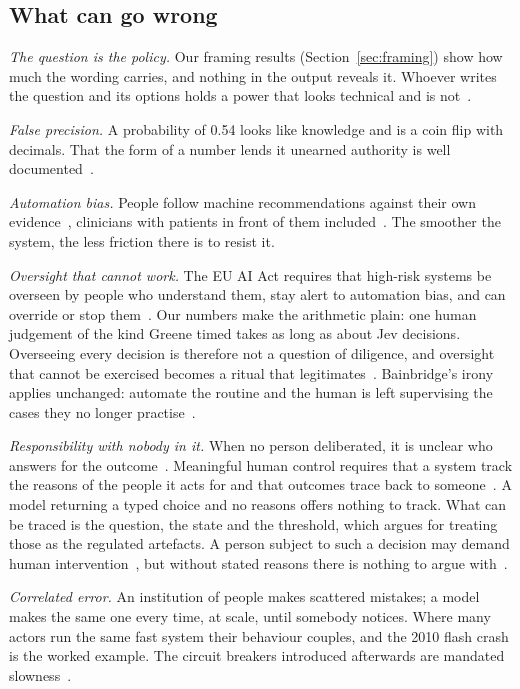 \documentclass[journal]{IEEEtran}
\begin{document}
\subsection{What can go wrong}

\emph{The question is the policy.} Our framing results (Section~\ref{sec:framing}) show how much
the wording carries, and nothing in the output reveals it. Whoever writes the question and its
options holds a power that looks technical and is not~\cite{rahwan2018}.

\emph{False precision.} A probability of 0.54 looks like knowledge and is a coin flip with
decimals. That the form of a number lends it unearned authority is well
documented~\cite{mittelstadt2016}.

\emph{Automation bias.} People follow machine recommendations against their own
evidence~\cite{skitka1999,parasuraman1997}, clinicians with patients in front of them
included~\cite{goddard2012}. The smoother the system, the less friction there is to resist it.

\emph{Oversight that cannot work.} The EU AI Act requires that high-risk systems be overseen by
people who understand them, stay alert to automation bias, and can override or stop
them~\cite{euaiact2024}. Our numbers make the arithmetic plain: one human judgement of the kind
Greene timed takes as long as about \DecisionsPerHumanOne{} Jev decisions. Overseeing every
decision is therefore not a question of diligence, and oversight that cannot be exercised becomes
a ritual that legitimates~\cite{green2022,zerilli2019}. Bainbridge's irony applies unchanged:
automate the routine and the human is left supervising the cases they no longer
practise~\cite{bainbridge1983}.

\emph{Responsibility with nobody in it.} When no person deliberated, it is unclear who answers for
the outcome~\cite{matthias2004,sparrow2007}. Meaningful human control requires that a system track
the reasons of the people it acts for and that outcomes trace back to
someone~\cite{santoni2018}. A model returning a typed choice and no reasons offers nothing to
track. What can be traced is the question, the state and the threshold, which argues for treating
those as the regulated artefacts. A person subject to such a decision may demand human
intervention~\cite{gdpr2016}, but without stated reasons there is nothing to argue
with~\cite{danaher2016}.

\emph{Correlated error.} An institution of people makes scattered mistakes; a model makes the same
one every time, at scale, until somebody notices. Where many actors run the same fast system their
behaviour couples, and the 2010 flash crash is the worked example. The circuit breakers introduced
afterwards are mandated slowness~\cite{kirilenko2017}.
\end{document}
